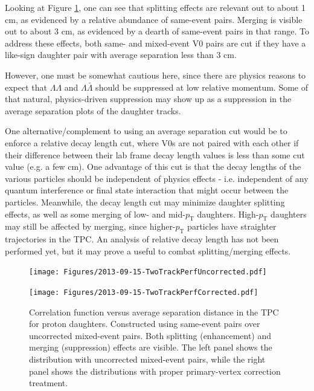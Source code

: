 Looking at Figure \ref{fig:TwoTrackPerf}, one can see that splitting effects are relevant out to about 1 cm, as evidenced by a relative abundance of same-event pairs.  Merging is visible out to about 3 cm, as evidenced by a dearth of same-event pairs in that range.  To address these effects, both same- and mixed-event V0 pairs are cut if they have a like-sign daughter pair with average separation less than 3 cm.  

However, one must be somewhat cautious here, since there are physics reasons to expect that $\Lambda\Lambda$ and $\Lambda\bar{\Lambda}$ should be suppressed at low relative momentum.  Some of that natural, physics-driven suppression may show up as a suppression in the average separation plots of the daughter tracks.  

One alternative/complement to using an average separation cut would be to enforce a relative decay length cut, where V0s are not paired with each other if their difference between their lab frame decay length values is less than some cut value (e.g. a few cm).  One advantage of this cut is that the decay lengths of the various particles should be independent of physics effects - i.e. independent of any quantum interference or final state interaction that might occur between the particles.  Meanwhile, the decay length cut may minimize daughter splitting effects, as well as some merging of low- and mid-$p_{\mathrm{T}}$ daughters.  High-$p_{\mathrm{T}}$ daughters may still be affected by merging, since higher-$p_{\mathrm{T}}$ particles have straighter trajectories in the TPC.  An analysis of relative decay length has not been performed yet, but it may prove a useful to combat splitting/merging effects.




\begin{figure}[h]
\begin{minipage}{18pc}
\texttt{[image: Figures/2013-09-15-TwoTrackPerfUncorrected.pdf]}
\end{minipage}\hspace{2pc}
\begin{minipage}{18pc}
\texttt{[image: Figures/2013-09-15-TwoTrackPerfCorrected.pdf]}
\end{minipage} 
\caption[Two-track reconstruction effects]{\label{fig:TwoTrackPerf}Correlation function versus average separation distance in the TPC for proton daughters.  Constructed using same-event pairs over uncorrected mixed-event pairs.  Both splitting (enhancement) and merging (suppression) effects are visible. The left panel shows the distribution with uncorrected mixed-event pairs, while the right panel shows the distributions with proper primary-vertex correction treatment.}
\end{figure}

